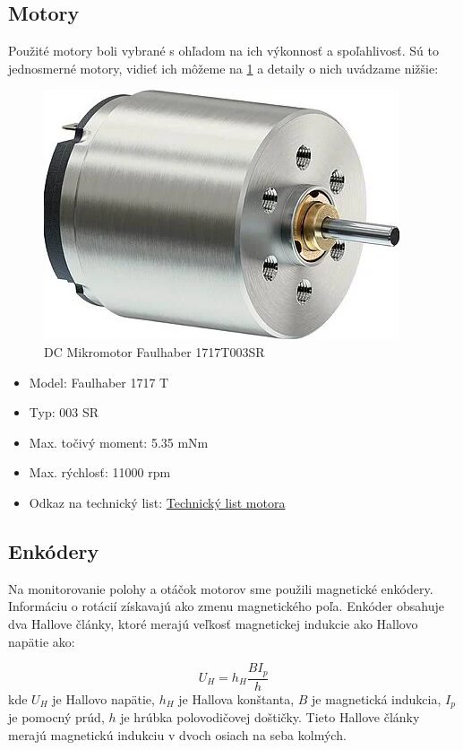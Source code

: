 \subsection{Motory}\label{motor_section}
Použité motory boli vybrané s ohľadom na ich výkonnosť a spoľahlivosť. Sú to jednosmerné motory, vidieť ich môžeme na \ref{fig:motor} a detaily o nich uvádzame nižšie:

\begin{figure}[!htbp]
		\centering
		\includegraphics[scale=0.8]{includes/images/faulhaber.png}
		\caption{DC Mikromotor Faulhaber 1717T003SR}
		\label{fig:motor}
\end{figure}

\begin{itemize}
  \item Model: Faulhaber 1717 T 
  \item Typ: 003 SR
  \item Max. točivý moment: 5.35 mNm
  \item Max. rýchlosť: 11000 rpm
  \item Odkaz na technický list: \href{https://www.faulhaber.com/fileadmin/Import/Media/EN_1717_SR_DFF.pdf}{Technický list motora}
\end{itemize}

\subsection{Enkódery}\label{encoder_section}
Na monitorovanie polohy a otáčok motorov sme použili magnetické enkódery. Informáciu o rotácií získavajú ako zmenu magnetického poľa. Enkóder obsahuje dva Hallove články, ktoré merajú veľkosť magnetickej indukcie ako Hallovo napätie ako: 



\begin{equation}
\label{enc_eq}
U_H = h_H \frac{BI_p}{h}
\end{equation}
kde $U_H$ je Hallovo napätie, $h_H$ je Hallova konštanta, $B$ je magnetická indukcia, $I_p$ je pomocný prúd, $h$ je hrúbka polovodičovej doštičky. Tieto Hallove články merajú magnetickú indukciu v dvoch osiach na seba kolmých.



